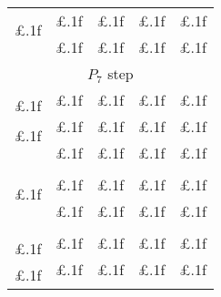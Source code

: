 \documentclass[11pt]{article}
\begin{document}
\begin{table}
\begin{tabular}{|ccccc|}
 & \multirow{2}{*}{£.1f} & \multirow{2}{*}{£.1f} & \multirow{2}{*}{£.1f} & \multirow{2}{*}{£.1f} \\ %
\multirow{2}{*}{£.1f} & & & & \\ \cline{2-5} 
 & \multirow{2}{*}{£.1f} & \multirow{2}{*}{£.1f} & \multirow{2}{*}{£.1f} & \multirow{2}{*}{£.1f} \\ %
 & & & & \\ \hline \hline
\multicolumn{5}{|c|}{\multirow{2}{*}{$P_7$ step}} \\
\multicolumn{5}{|c|}{} \\ \hline
 & \multirow{2}{*}{£.1f} & \multirow{2}{*}{£.1f} & \multirow{2}{*}{£.1f} & \multirow{2}{*}{£.1f} \\ %
\multirow{2}{*}{£.1f} & & & & \\ \cline{2-5} 
 & \multirow{2}{*}{£.1f} & \multirow{2}{*}{£.1f} & \multirow{2}{*}{£.1f} & \multirow{2}{*}{£.1f} \\ %
\multirow{2}{*}{£.1f} & & & & \\ \cline{2-5} 
 & \multirow{2}{*}{£.1f} & \multirow{2}{*}{£.1f} & \multirow{2}{*}{£.1f} & \multirow{2}{*}{£.1f} \\ %
 & & & & \\ \hline \hline
\multicolumn{5}{|c|}{\multirow{2}{*}{\citet{Adhikari2002}}} \\
\multicolumn{5}{|c|}{} \\ \hline
 & \multirow{2}{*}{£.1f} & \multirow{2}{*}{£.1f} & \multirow{2}{*}{£.1f} & \multirow{2}{*}{£.1f} \\ %
\multirow{2}{*}{£.1f} & & & & \\ \cline{2-5} 
 & \multirow{2}{*}{£.1f} & \multirow{2}{*}{£.1f} & \multirow{2}{*}{£.1f} & \multirow{2}{*}{£.1f} \\ %
 & & & & \\ \hline \hline
\multicolumn{5}{|c|}{\multirow{2}{*}{\citet{erlicher_modal_2007}}} \\
\multicolumn{5}{|c|}{} \\ \hline
 & \multirow{2}{*}{£.1f} & \multirow{2}{*}{£.1f} & \multirow{2}{*}{£.1f} & \multirow{2}{*}{£.1f} \\ %
\multirow{2}{*}{£.1f} & & & & \\ \cline{2-5} 
 & \multirow{2}{*}{£.1f} & \multirow{2}{*}{£.1f} & \multirow{2}{*}{£.1f} & \multirow{2}{*}{£.1f} \\ %
\multirow{2}{*}{£.1f} & & & & \\ \cline{2-5} 

\end{tabular}
\end{table}
\end{document}

